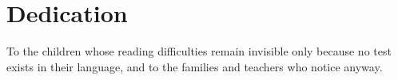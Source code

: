 \section*{Dedication}

To the children whose reading difficulties remain invisible only because no test exists in their language, and to the families and teachers who notice anyway.

\pagebreak
